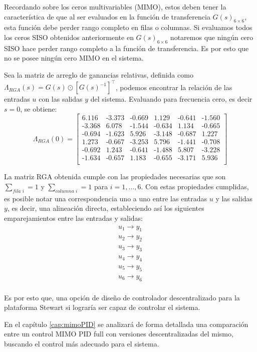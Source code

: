 Recordando sobre los ceros multivariables (MIMO), estos deben tener la característica de que al ser evaluados en la función de transferencia $G(s)_{6\times6}$, esta función debe perder rango completo en filas o columnas. Si evaluamos todos los ceros SISO obtenidos anteriormente en $G(s)_{6\times6}$ notaremos que ningún cero SISO hace perder rango completo a la función de transferencia. Es por esto que no se posee ningún cero MIMO en el sistema.

Sea la matriz de arreglo de ganancias relativas, definida como $\Lambda_{RGA}(s) = G(s)\odot \left[ G(s)^{-1} \right]^\top$, podemos encontrar la relación de las entradas $u$ con las salidas $y$ del sistema. Evaluando para frecuencia cero, es decir $s=0$, se obtiene:
\begin{equation} 
    \Lambda_{RGA}(0) = \begin{bmatrix}
        6.116 &  \textrm{-}3.373 &  \textrm{-}0.669 &   1.129 & \textrm{-}0.641  & \textrm{-}1.560 \\
       \textrm{-}3.368 &  6.078  &  \textrm{-}1.544 &  \textrm{-}0.634 & 1.134   & \textrm{-}0.665 \\
       \textrm{-}0.694 &  \textrm{-}1.623 &   5.926 &  \textrm{-}3.148 & \textrm{-}0.687  &  1.227 \\
        1.273 &  \textrm{-}0.667 &  \textrm{-}3.253 &   5.796 & \textrm{-}1.441  & \textrm{-}0.708 \\
       \textrm{-}0.692 &   1.243 &  \textrm{-}0.641 &  \textrm{-}1.488 & 5.807   & \textrm{-}3.228 \\
       \textrm{-}1.634 &  \textrm{-}0.657 &   1.183 &  \textrm{-}0.655 & \textrm{-}3.171  & 5.936 \\
    \end{bmatrix}
\end{equation}

La matriz RGA obtenida cumple con las propiedades necesarias que son $\sum_{\textit{fila i}} = 1$ y $\sum_{\textit{columna i}} = 1$ para $i = 1,\hdots,6$. Con estas propiedades cumplidas, es posible notar una correspondencia uno a uno entre las entradas $u$ y las salidas $y$, es decir, una alineación directa, estableciendo así los siguientes emparejamientos entre las entradas y salidas:
\begin{align*}
    u_1 \rightarrow y_1 \\
    u_2 \rightarrow y_2 \\
    u_3 \rightarrow y_3 \\
    u_4 \rightarrow y_4 \\
    u_5 \rightarrow y_5 \\
    u_6 \rightarrow y_6 \\
\end{align*}

Es por esto que, una opción de diseño de controlador descentralizado para la plataforma Stewart si lograría ser capaz de controlar el sistema. 

En el capítulo \ref{cap:mimoPID} se analizará de forma detallada una comparación entre un control MIMO PID full con versiones descentralizadas del mismo, buscando el control más adecuado para el sistema.

